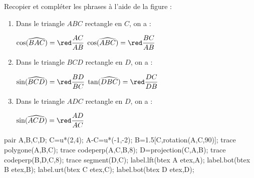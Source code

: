 \begin{corrige}
    Recopier et compléter les phrases à l'aide de la figure :
    
    \begin{enumerate}
        \item Dans le triangle $ABC$ rectangle en $C$, on a :
        
        $\cos(\widehat{BAC})={\red\dfrac{AC}{AB}}$ \hfill $\cos(\widehat{ABC})={\red\dfrac{BC}{AB}}$\\\smallskip        
        \item Dans le triangle $BCD$ {\red rectangle en $D$}, on a :
        
        $\sin(\widehat{BCD})={\red\dfrac{BD}{BC}}$ \hfill $\tan(\widehat{DBC})={\red\dfrac{DC}{DB}}$\\\smallskip
        \item Dans le triangle $ADC$ {\red rectangle en $D$}, on a :
        
        $\sin(\widehat{ACD})={\red\dfrac{AD}{AC}}$
    \end{enumerate}

    \begin{Geometrie}[CoinHD={(7.5u,4.5u)}]        
        pair A,B,C,D;
        C=u*(2,4);
        A-C=u*(-1,-2);
        B=1.5[C,rotation(A,C,90)];
        trace polygone(A,B,C);            
        trace codeperp(A,C,B,8);
        D=projection(C,A,B);
        trace codeperp(B,D,C,8);
        trace segment(D,C);
        label.lft(btex A etex,A);
        label.bot(btex B etex,B);
        label.urt(btex C etex,C);
        label.bot(btex D etex,D);
    \end{Geometrie}
\end{corrige}

